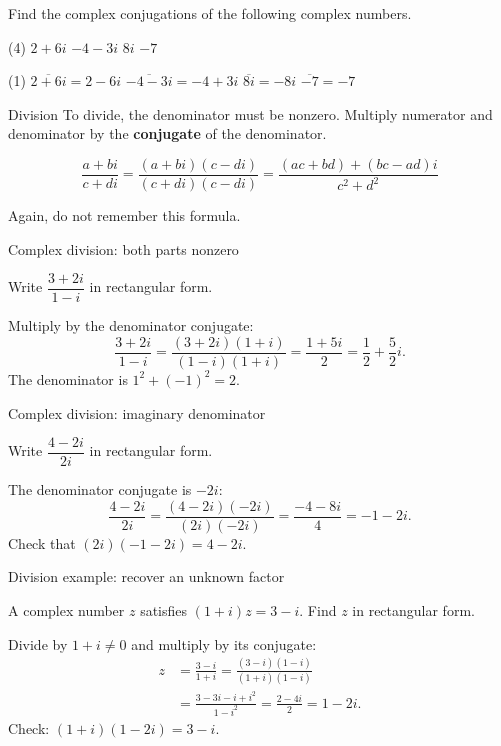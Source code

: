 \begin{frame}[t]
\begin{ex}
Find the complex conjugations of the following complex numbers.
\begin{tasks}(4)
\task $2+6i$
\task $-4-3i$
\task $8i$
\task $-7$
\end{tasks}
\end{ex}
\begin{sol}
\begin{tasks}(1)
\task $\overline{2+6i}=2-6i$
\task $\overline{-4-3i} = -4+3i$
\task $\overline{8i} = -8i$
\task $\overline{-7} = -7$
\end{tasks}
\end{sol}
\end{frame}

\begin{frame}{Division}
To divide, the denominator must be nonzero. Multiply numerator and denominator by the \textbf{conjugate} of the denominator.
\begin{thm}{}{}
\begin{equation}
\frac{a+bi}{c+di} = \frac{(a+bi)(c-di)}{(c+di)(c-di)} = \frac{(ac+bd) + (bc-ad)i}{c^2+d^2}
\end{equation}
\end{thm}
Again, do not remember this formula.
\end{frame}
\begin{frame}[t]{Complex division: both parts nonzero}
\small
\begin{ex}
Write $\dfrac{3+2i}{1-i}$ in rectangular form.
\end{ex}
\begin{sol}
Multiply by the denominator conjugate:\[\frac{3+2i}{1-i}=\frac{(3+2i)(1+i)}{(1-i)(1+i)}=\frac{1+5i}{2}=\frac12+\frac52i.\] The denominator is $1^2+(-1)^2=2$.
\end{sol}
\end{frame}

\begin{frame}[t]{Complex division: imaginary denominator}
\small
\begin{ex}
Write $\dfrac{4-2i}{2i}$ in rectangular form.
\end{ex}
\begin{sol}
The denominator conjugate is $-2i$:\[\frac{4-2i}{2i}=\frac{(4-2i)(-2i)}{(2i)(-2i)}=\frac{-4-8i}{4}=-1-2i.\] Check that $(2i)(-1-2i)=4-2i$.
\end{sol}
\end{frame}
\begin{frame}[t]{Division example: recover an unknown factor}
\begin{ex}
A complex number $z$ satisfies $(1+i)z=3-i$. Find $z$ in rectangular form.
\end{ex}
\begin{sol}
Divide by $1+i\ne0$ and multiply by its conjugate:
\begin{align*}
z&=\frac{3-i}{1+i}
  =\frac{(3-i)(1-i)}{(1+i)(1-i)}\\
 &=\frac{3-3i-i+i^2}{1-i^2}
  =\frac{2-4i}{2}=1-2i.
\end{align*}
Check: $(1+i)(1-2i)=3-i$.
\end{sol}
\end{frame}



